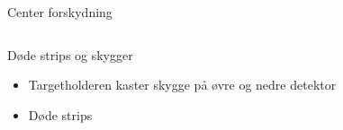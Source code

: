 \begin{frame}{Center forskydning}
\begin{columns}
\end{columns}
\end{frame}

\begin{frame}{Døde strips og skygger}
	\begin{itemize}
		\item Targetholderen kaster skygge på øvre og nedre detektor
		\item Døde strips 
	\end{itemize}
\end{frame}